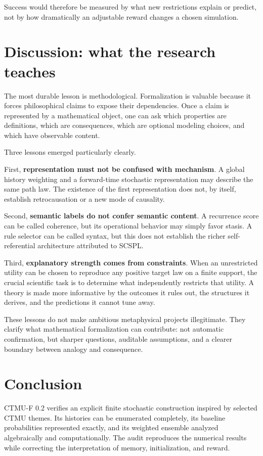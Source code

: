 \documentclass[11pt]{article}
\theoremstyle{remark}
\begin{document}
Success would therefore be measured by what new restrictions explain or predict, not by how dramatically an adjustable reward changes a chosen simulation.

\section{Discussion: what the research teaches}

The most durable lesson is methodological. Formalization is valuable because it forces philosophical claims to expose their dependencies. Once a claim is represented by a mathematical object, one can ask which properties are definitions, which are consequences, which are optional modeling choices, and which have observable content.

Three lessons emerged particularly clearly.

First, \textbf{representation must not be confused with mechanism}. A global history weighting and a forward-time stochastic representation may describe the same path law. The existence of the first representation does not, by itself, establish retrocausation or a new mode of causality.

Second, \textbf{semantic labels do not confer semantic content}. A recurrence score can be called coherence, but its operational behavior may simply favor stasis. A rule selector can be called syntax, but this does not establish the richer self-referential architecture attributed to SCSPL.

Third, \textbf{explanatory strength comes from constraints}. When an unrestricted utility can be chosen to reproduce any positive target law on a finite support, the crucial scientific task is to determine what independently restricts that utility. A theory is made more informative by the outcomes it rules out, the structures it derives, and the predictions it cannot tune away.

These lessons do not make ambitious metaphysical projects illegitimate. They clarify what mathematical formalization can contribute: not automatic confirmation, but sharper questions, auditable assumptions, and a clearer boundary between analogy and consequence.

\section{Conclusion}

CTMU-F 0.2 verifies an explicit finite stochastic construction inspired by selected CTMU themes. Its histories can be enumerated completely, its baseline probabilities represented exactly, and its weighted ensemble analyzed algebraically and computationally. The audit reproduces the numerical results while correcting the interpretation of memory, initialization, and reward.
\end{document}
